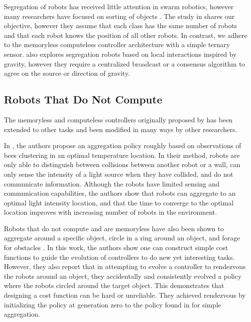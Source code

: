 \documentclass[conference]{IEEEtran}
\begin{document}
    Segregation of robots has received little attention in swarm robotics, however many researchers have focused on sorting of objects \cite{vardy_accelerated_2012} \cite{holland_collective_1998} \cite{tao_wang_collective_2004} \cite{holland_stigmergy_1999}. The study in \cite{santos_segregation_2014} shares our objective, however they assume that each class has the same number of robots and that each robot knows the position of all other robots. In contrast, we adhere to the memoryless computeless controller architecture with a simple ternary sensor. \cite{gros_segregation_2009} also explores segregation robots based on local interactions inspired by gravity, however they require a centralized broadcast or a consensus algorithm to agree on the source or direction of gravity.

  \subsection{Robots That Do Not Compute}

    The memoryless and computeless controllers originally proposed by \cite{gauci_self-organized_2014} has been extended to other tasks and been modified in many ways by other researchers.

    In \cite{kernbach_re-embodiment_2009}, the authors propose an aggregation policy roughly based on observations of bees clustering in an optimal temperature location. In their method, robots are only able to distinguish between collisions between another robot or a wall, can only sense the intensity of a light source when they have collided, and do not communicate information. Although the robots have limited sensing and communication capabilities, the authors show that robots can aggregate to an optimal light intensity location, and that the time to converge to the optimal location improves with increasing number of robots in the environment.

    Robots that do not compute and are memoryless have also been shown to aggregate around a specific object, circle in a ring around an object, and forage for obstacles \cite{johnson_evolving_2016}. In this work, the authors show one can construct simple cost functions to guide the evolution of controllers to do new yet interesting tasks. However, they also report that in attempting to evolve a controller to rendezvous the robots around an object, they accidentally and consistently evolved a policy where the robots circled around the target object. This demonstrates that designing a cost function can be hard or unreliable. They achieved rendezvous by initializing the policy at generation zero to the policy found in \cite{gauci_self-organized_2014} for simple aggregation.
\end{document}
